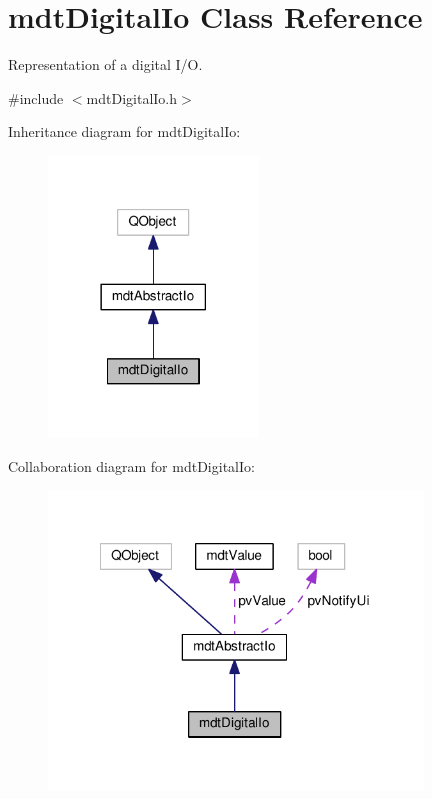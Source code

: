 \hypertarget{classmdt_digital_io}{\section{mdt\-Digital\-Io Class Reference}
\label{classmdt_digital_io}
}


Representation of a digital I/\-O.  




{\ttfamily \#include $<$mdt\-Digital\-Io.\-h$>$}



Inheritance diagram for mdt\-Digital\-Io\-:
\nopagebreak
\begin{figure}[H]
\begin{center}
\leavevmode
\includegraphics[width=158pt]{classmdt_digital_io__inherit__graph}
\end{center}
\end{figure}


Collaboration diagram for mdt\-Digital\-Io\-:
\nopagebreak
\begin{figure}[H]
\begin{center}
\leavevmode
\includegraphics[width=282pt]{classmdt_digital_io__coll__graph}
\end{center}
\end{figure}
